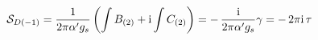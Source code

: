 \begin{equation}
\label{insgr}
{\cal S}_{D(-1)} =  \frac{1}{2 \pi \alpha' g_s} \left(\int B_{(2)} +
{\rm i} \int C_{(2)} \right) = - \, \frac{{\rm i}}{2 \pi \alpha' g_s}
\gamma = - \, 2 \pi {\rm i} \, \tau
\end{equation}

